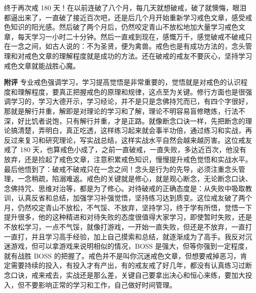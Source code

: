 \begin{case}
    终于再次戒 180 天！在以前连破了八个月，每几天就想破戒，破了就懊悔，眼泪都逼出来了，一直破了接近百次吧，还是后几个月开始重新学习戒色文章，感受戒色知识的阳光感。然后破了两个月后，仍然咬定青山不放松地加大量学习戒色文章，每天学习一小时二十分钟。然后一直戒到现在，感慨万千，感觉破戒不破戒只在一念之间，如古人说的：不为圣贤，便为禽兽。戒色也是有成功方法的，念头管理和对戒色文章的理解程度就是成功的方法。还在破戒的戒友不要灰心，坚持学习戒色文章就能战胜心魔。

    \textbf{附评} 专业戒色强调学习，学习提高觉悟是非常重要的，觉悟就是对戒色的认识程度和理解程度，要真正把握戒色的原理和规律，这点至为关键。修行方面也是很强调学习的，学习大德开示，学习经论，并不是只是念佛持咒而已，有四个字很好，那就是解行并重，解即是对理论的学习和了解，理论不明容易盲修瞎炼，行法不深，好比饥者说饱，只有解行并重，才是正路。就像断念口诀一样，先把断念的理论搞清楚，弄明白，真正吃透，这样练习起来就会事半功倍，通过练习和实战，再反过来复习和研究理论，写实战总结，这样实战水平自然会越来越厉害。这位戒友戒了 180 天，也算戒色小成了，之前一直破戒，一直失败，多达近百次，他没有放弃，还是捡起了戒色文章，注意积累戒色知识，慢慢提升戒色觉悟和实战水平。最后他悟到了：破戒不破戒只在一念之间！念头是行为的先导，必须注重念头管理，一念稍疏，陷溺难返。戒色的关键就是修心，就是观心断念，无论断念口诀、念佛持咒、思维对治等，都是为了修心。对待破戒的正确态度是：从失败中吸取教训，认真反省和总结，加强学习补强觉悟，坚持练习达到质变。这位戒友破了两个月，仍然咬定青山不放松，不气馁、不放弃，坚持学习，终于学有所悟，觉悟一下提升很多，他的这种精进和对待失败的态度很值得大家学习，即使暂时失败，还是不放松学习，一点不气馁，就像打游戏，一开始一直失败，但还是不放弃，一直打一直打，并且学习高手经验，加上自己摸索和总结，就逐渐成为了高手。我反对沉迷游戏，但可以拿游戏来说明相似的情况，BOSS 是强大，但等你强到一定程度，就有战胜 BOSS 的把握了。戒色并不是叫你沉迷戒色文章，但想要戒掉恶习，肯定需要持续的投入，有投入才有产出，有的戒友戒了好几年，都没有认真练习过断念口诀，戒来戒去，实战还是那么差，关键自己要拿出决心和恒心来练，要加大投入，但不要影响正常的学习和工作，自己做好时间管理。
\end{case}

